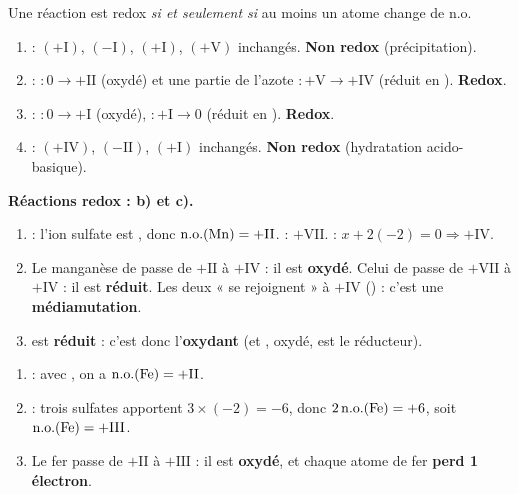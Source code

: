 \documentclass[11pt,a4paper]{article}
\begin{document}
\begin{corrige}
Une réaction est redox \emph{si et seulement si} au moins un atome change de n.o.
\begin{enumerate}[label=\alph*)]
  \item {} : $(+\mathrm{I})$, $(-\mathrm{I})$,
        $(+\mathrm{I})$, $(+\mathrm{V})$ inchangés. \textbf{Non redox} (précipitation).
  \item {} : $:0\to+\mathrm{II}$ (oxydé) et une
        partie de l'azote $:+\mathrm{V}\to+\mathrm{IV}$ (réduit en ). \textbf{Redox}.
  \item {} : $:0\to+\mathrm{I}$ (oxydé), $:+\mathrm{I}\to 0$
        (réduit en ). \textbf{Redox}.
  \item {} : $(+\mathrm{IV})$, $(-\mathrm{II})$, $(+\mathrm{I})$
        inchangés. \textbf{Non redox} (hydratation acido-basique).
\end{enumerate}
\textbf{Réactions redox : b) et c).}
\end{corrige}

\begin{corrige}
\begin{enumerate}[label=\alph*)]
  \item {} : l'ion sulfate est , donc $\mathrm{n.o.}(\ce{Mn})=+\mathrm{II}$.
         : $+\mathrm{VII}$.  : $x+2(-2)=0\Rightarrow +\mathrm{IV}$.
  \item Le manganèse de  passe de $+\mathrm{II}$ à $+\mathrm{IV}$ : il est \textbf{oxydé}.
        Celui de  passe de $+\mathrm{VII}$ à $+\mathrm{IV}$ : il est \textbf{réduit}. Les
        deux « se rejoignent » à $+\mathrm{IV}$ () : c'est une \textbf{médiamutation}.
  \item {} est \textbf{réduit} : c'est donc l'\textbf{oxydant} (et , oxydé, est le
        réducteur).
\end{enumerate}
\end{corrige}

\begin{corrige}
\begin{enumerate}[label=\alph*)]
  \item {} : avec , on a $\mathrm{n.o.}(\ce{Fe})=+\mathrm{II}$.
  \item {} : trois sulfates apportent $3\times(-2)=-6$, donc $2\,\mathrm{n.o.}(\ce{Fe})=+6$,
        soit $\mathrm{n.o.}(\ce{Fe})=+\mathrm{III}$.
  \item Le fer passe de $+\mathrm{II}$ à $+\mathrm{III}$ : il est \textbf{oxydé}, et chaque atome de
        fer \textbf{perd 1 électron}.
\end{enumerate}
\end{corrige}
\end{document}

